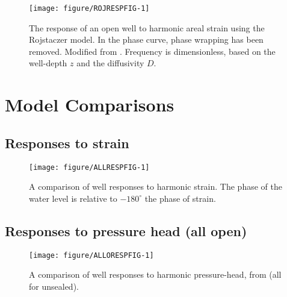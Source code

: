 \documentclass[12pt]{article}\usepackage[]{graphicx}\usepackage[]{xcolor}
\makeatletter
\def\maxwidth{ %
  \ifdim\Gin@nat@width>\linewidth
    \linewidth
  \else
    \Gin@nat@width
  \fi
}
\newenvironment{knitrout}{}{} %
\makeatother
\begin{document}
\begin{figure}[htb!]
\begin{center}
\begin{knitrout}\small
{}\color{fgcolor}
\texttt{[image: figure/ROJRESPFIG-1]} 
\end{knitrout}
\caption{The response of an open well to harmonic areal strain using
the Rojstaczer model. In the phase curve, phase wrapping has been removed.
Modified from \citet[][Fig.~3]{rojstaczer1988}.
Frequency is dimensionless, based on the well-depth $z$ and the diffusivity
$D$.}
\label{fig:owrsp-roj}
\end{center}
\end{figure}


\clearpage
\section{Model Comparisons}

\subsection{Responses to strain}
\begin{figure}[htb!]
\begin{center}
\begin{knitrout}\small
{}\color{fgcolor}
\texttt{[image: figure/ALLRESPFIG-1]} 
\end{knitrout}
\caption{A comparison of well responses to harmonic strain. 
The phase of the water level is relative to $-180^\circ$ the phase of strain.}
\label{fig:ewrsp-all}
\end{center}
\end{figure}

\clearpage
\subsection{Responses to pressure head (all open)}
\begin{figure}[htb!]
\begin{center}
\begin{knitrout}\small
{}\color{fgcolor}
\texttt{[image: figure/ALLORESPFIG-1]} 
\end{knitrout}
\caption{A comparison of well responses to harmonic pressure-head, 
from \citet{cooper1965, hsieh1987, liu1989} (all for unsealed).}
\label{fig:owrsp-all}
\end{center}
\end{figure}



\end{document}
